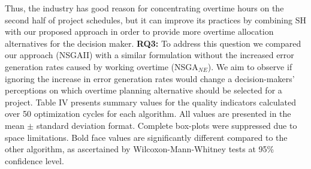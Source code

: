 \documentclass[conference]{IEEEtran}
\begin{document}
Thus, the industry has good reason for concentrating overtime hours on the second half of project schedules, but it can improve its practices by combining SH with our proposed approach in order to provide more overtime allocation alternatives for the decision maker. \linebreak
\textbf{RQ3:} To address this question we compared our approach (NSGAII) with a similar formulation without the increased error generation rates caused by working overtime (NSGA$_{NE}$). We aim to observe if ignoring the increase in error generation rates would change a decision-makers' perceptions on which overtime planning alternative should be selected for a project. Table IV presents summary values for the quality indicators calculated over 50 optimization cycles for each algorithm. All values are presented in the mean $\pm$ standard deviation format. Complete box-plots were suppressed due to space limitations. Bold face values are significantly different compared to the other algorithm, as ascertained by Wilcoxon-Mann-Whitney tests at 95\% confidence level. 
\end{document}

